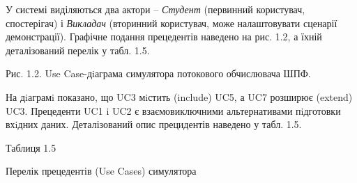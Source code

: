 \documentclass[
]{article}
\begin{document}
У системі виділяються два актори -- \emph{Студент} (первинний
користувач, спостерігач) і \emph{Викладач} (вторинний користувач, може
налаштовувати сценарії демонстрації). Графічне подання прецедентів
наведено на рис. 1.2, а їхній деталізований перелік у табл. 1.5.



Рис. 1.2. Use Case-дiаграма симулятора потокового обчислювача ШПФ.

На дiаграмi показано, що UC3 мiстить (include) UC5, а UC7 розширює
(extend) UC3. Прецеденти UC1 i UC2 є взаємовиключними альтернативами
пiдготовки вхiдних даних. Деталізований опис прецидентів наведено у
табл. 1.5.

Таблиця 1.5

Перелік прецедентів (Use Cases) симулятора
\end{document}
